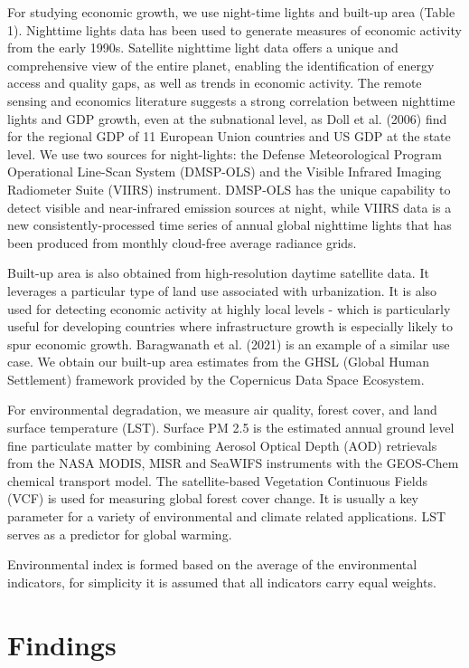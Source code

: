 \documentclass{article}
\begin{document}
For studying economic growth, we use night-time lights and built-up area (Table 1). Nighttime lights data has been used to generate measures of economic activity from the early 1990s. Satellite nighttime light data offers a unique and comprehensive view of the entire planet, enabling the identification of energy access and quality gaps, as well as trends in economic activity. The remote sensing and economics literature suggests a strong correlation between nighttime lights and GDP growth, even at the subnational level, as Doll et al. (2006) find for the regional GDP of 11 European Union countries and US GDP at the state level. We use two sources for night-lights: the Defense Meteorological Program Operational Line-Scan System (DMSP-OLS) and the Visible Infrared Imaging Radiometer Suite (VIIRS) instrument. DMSP-OLS has the unique capability to detect visible and near-infrared emission sources at night, while VIIRS data is a new consistently-processed time series of annual global nighttime lights that has been produced from monthly cloud-free average radiance grids.

Built-up area is also obtained from high-resolution daytime satellite data. It leverages a particular type of land use associated with urbanization. It is also used for detecting economic activity at highly local levels - which is particularly useful for developing countries where infrastructure growth is especially likely to spur economic growth. Baragwanath et al. (2021) is an example of a similar use case. We obtain our built-up area estimates from the GHSL (Global Human Settlement) framework provided by the Copernicus Data Space Ecosystem. 

For environmental degradation, we measure air quality, forest cover, and land surface temperature (LST). Surface PM 2.5 is the estimated annual ground level fine particulate matter by combining Aerosol Optical Depth (AOD) retrievals from the NASA MODIS, MISR and SeaWIFS instruments with the GEOS-Chem chemical transport model. The satellite-based Vegetation Continuous Fields (VCF) is used for measuring global forest cover change. It is usually a key parameter for a variety of environmental and climate related applications. LST serves as a predictor for global warming. 

Environmental index is formed based on the average of the environmental indicators, for simplicity it is assumed that all indicators carry equal weights.


\section{Findings}
\end{document}
